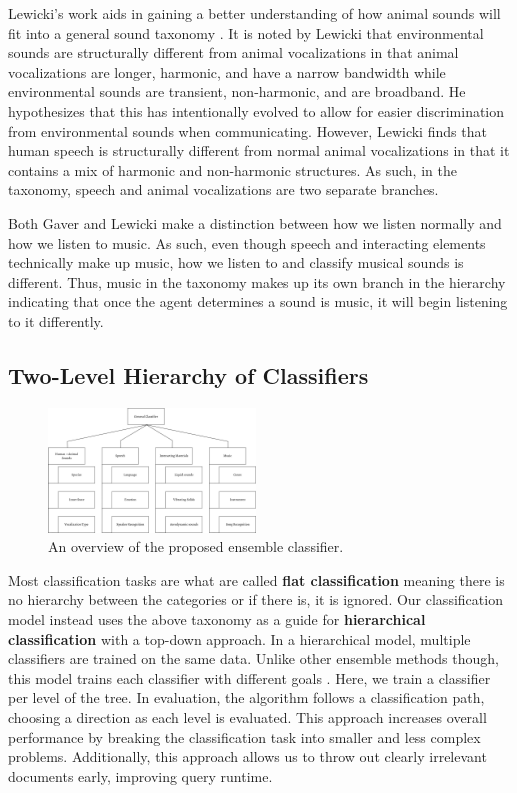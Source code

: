 Lewicki's work aids in gaining a better understanding of how animal sounds will
fit into a general sound taxonomy \cite{lewicki-efficient-2002}. It is noted by
Lewicki that environmental sounds are structurally different from animal
vocalizations in that animal vocalizations are longer, harmonic, and have a
narrow bandwidth while environmental sounds are transient, non-harmonic, and are
broadband. He hypothesizes that this has intentionally evolved to allow for
easier discrimination from environmental sounds when communicating. However,
Lewicki finds that human speech is structurally different from normal animal
vocalizations in that it contains a mix of harmonic and non-harmonic structures.
As such, in the taxonomy, speech and animal vocalizations are two separate
branches.

Both Gaver and Lewicki make a distinction between how we listen normally and how
we listen to music. As such, even though speech and interacting elements
technically make up music, how we listen to and classify musical sounds is
different. Thus, music in the taxonomy makes up its own branch in the hierarchy
indicating that once the agent determines a sound is music, it will begin
listening to it differently.

\subsection{Two-Level Hierarchy of Classifiers}
\label{sec:classification-hierarchy}

\begin{figure}[h!]
    \centering
    \includegraphics[width=0.49\textwidth]{figures/ensemble-overview.png}
    \caption{An overview of the proposed ensemble classifier.}
    \label{fig:classifier-hierarchy}
\end{figure}

Most classification tasks are what are called \textbf{flat classification}
meaning there is no hierarchy between the categories or if there is, it is
ignored. Our classification model instead uses the above taxonomy as a guide for \textbf{hierarchical classification} with a top-down approach. In a hierarchical model, multiple classifiers are trained on the same data. Unlike other ensemble methods though, this model trains each classifier with different goals \cite{chou-hierarchical-2003}. Here, we train a classifier per level of the tree. In evaluation, the algorithm follows a classification path, choosing a direction as each level is evaluated. This approach increases overall performance by breaking the classification task into smaller and less complex problems. Additionally, this approach allows us to throw out clearly irrelevant documents early, improving query runtime.

